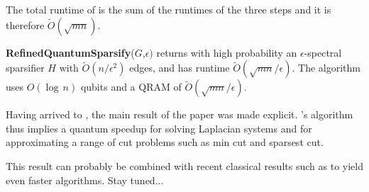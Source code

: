 The total runtime of  is the sum of the runtimes of the three steps and it is therefore $\tilde{O}(\sqrt{mn})$. 


\begin{theorem}\label{th:raf-spectral-sparisifaction}
\textbf{RefinedQuantumSparsify}($G$,$\epsilon)$ returns with high probability an
$\epsilon$-spectral sparsifier $H$ with $\tilde{O}(n/\epsilon^2)$ edges, and has
runtime $\tilde{O}(\sqrt{mn}/\epsilon)$. The algorithm uses $O(\log\, n)$ qubits
and a QRAM of $\tilde{O}(\sqrt{mn}/\epsilon)$.
\end{theorem}

Having arrived to , the main result of the paper was made explicit. \citeauthor{apers_quantum_2019}'s algorithm thus implies a quantum speedup for solving Laplacian systems and for approximating a range of cut problems such as min cut and sparsest cut.

This result can probably be combined with recent classical results such as \cite{chen_maximum_2022} to yield even faster algorithms. Stay tuned...